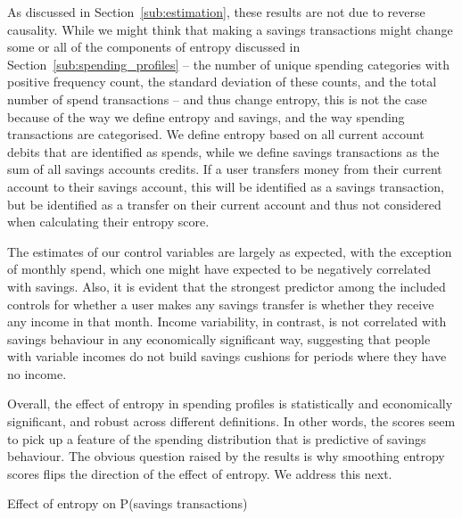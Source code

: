 As discussed in Section~\ref{sub:estimation}, these results are not due to
reverse causality. While we might think that making a savings transactions
might change some or all of the components of entropy discussed in
Section~\ref{sub:spending_profiles} -- the number of unique spending categories
with positive frequency count, the standard deviation of these counts, and the
total number of spend transactions -- and thus change entropy, this is not the
case because of the way we define entropy and savings, and the way spending
transactions are categorised. We define entropy based on all current account
debits that are identified as spends, while we define savings transactions as
the sum of all savings accounts credits. If a user transfers money from their
current account to their savings account, this will be identified as a savings
transaction, but be identified as a transfer on their current account and thus
not considered when calculating their entropy score.

The estimates of our control variables are largely as expected, with the
exception of monthly spend, which one might have expected to be negatively
correlated with savings. Also, it is evident that the strongest predictor among
the included controls for whether a user makes any savings transfer is whether
they receive any income in that month. Income variability, in contrast, is not
correlated with savings behaviour in any economically significant way,
suggesting that people with variable incomes do not build savings cushions for
periods where they have no income.

Overall, the effect of entropy in spending profiles is statistically and
economically significant, and robust across different definitions. In other
words, the scores seem to pick up a feature of the spending distribution that
is predictive of savings behaviour. The obvious question raised by the results
is why smoothing entropy scores flips the direction of the effect of entropy.
We address this next.

\begin{landscape}
    \begin{table}[ht]
        \centering\scriptsize
        \caption{Effect of entropy on P(savings transactions)}
        \label{tab:main}
        
    \end{table}
\end{landscape}

